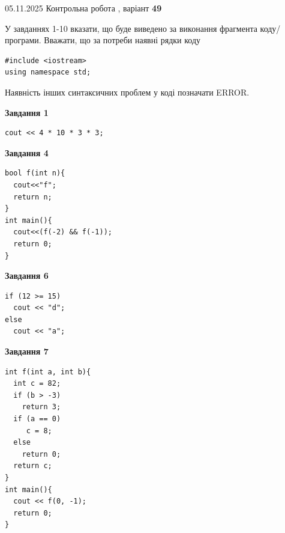 \documentclass[12pt, ukrainian]{article}
\begin{document}
\newpage

{\Large{05.11.2025 Контрольна робота , варіант  \No \textbf { 49 }\par}}
{
\begin {large}
У завданнях 1-10 вказати, що буде виведено за виконання фрагмента коду/про\-гра\-ми.
Вважати, що за потреби наявні рядки коду
\begin{verbatim}
#include <iostream>
using namespace std;
\end{verbatim}
Наявність інших синтаксичних проблем у коді позначати ERROR.

\begin{minipage}[t]{7.0cm}

\begin{center}
\textbf{Завдання 1}
\end{center}
\vspace{-8mm}

\begin{verbatim}
cout << 4 * 10 * 3 * 3;
\end{verbatim}



\begin{center}
\textbf{Завдання 4}
\end{center}
\vspace{-8mm}

\begin{verbatim}
bool f(int n){
  cout<<"f";
  return n;
}
int main(){
  cout<<(f(-2) && f(-1));
  return 0;
}
\end{verbatim}



\begin{center}
\textbf{Завдання 6}
\end{center}
\vspace{-8mm}

\begin{verbatim}
if (12 >= 15)
  cout << "d";
else
  cout << "a";
\end{verbatim}



\begin{center}
\textbf{Завдання 7}
\end{center}
\vspace{-8mm}

\begin{verbatim}
int f(int a, int b){
  int c = 82;
  if (b > -3)
    return 3;
  if (a == 0)
     c = 8;
  else
    return 0;
  return c;
}
int main(){
  cout << f(0, -1);
  return 0;
}
\end{verbatim}


\end{minipage}
\end{large}}
\end{document}
